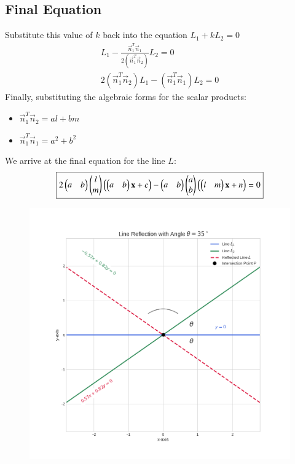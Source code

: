 \documentclass[journal]{IEEEtran}
\begin{document}
\subsection*{Final Equation}
Substitute this value of $k$ back into the equation $L_1 + k L_2 = 0$
\begin{align}
L_1 - \frac{\vec{n}_1^T \vec{n}_1}{2(\vec{n}_1^T \vec{n}_2)} L_2 = 0\\
2(\vec{n}_1^T \vec{n}_2) L_1 - (\vec{n}_1^T \vec{n}_1) L_2 = 0
\end{align}
Finally, substituting the algebraic forms for the scalar products:
\begin{itemize}
    \item $\vec{n}_1^T \vec{n}_2 = al + bm$
    \item $\vec{n}_1^T \vec{n}_1 = a^2 + b^2$
\end{itemize}
We arrive at the final equation for the line $L$:
\begin{align}
\boxed{2\begin{pmatrix}a&b\end{pmatrix}\begin{pmatrix}l\\m\end{pmatrix}\left(\begin{pmatrix}a&b\end{pmatrix}\mathbf{x}+c\right) - \begin{pmatrix}a&b\end{pmatrix}\begin{pmatrix}a\\b\end{pmatrix}\left(\begin{pmatrix}l&m\end{pmatrix}\mathbf{x}+n\right) = 0}
\end{align}
\newpage
 \begin{figure}
    \centering
    \includegraphics[width=0.9\columnwidth]{figs/Figure_1.png}
    \label{fig:placeholder}
    \caption{}
\end{figure}
\end{document}
